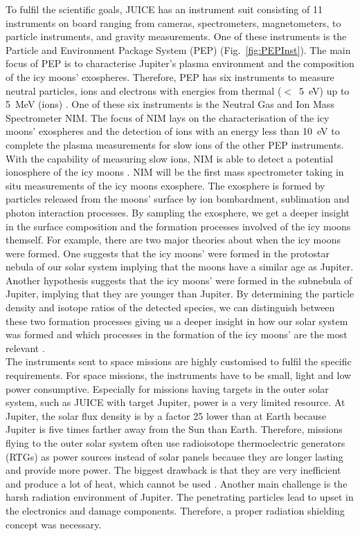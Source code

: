 	To fulfil the scientific goals, JUICE has an instrument suit consisting of 11 instruments on board ranging from cameras, spectrometers, magnetometers, to particle instruments, and gravity measurements. One of these instruments is the Particle and Environment Package System (PEP) (Fig.~\ref{fig:PEPInst}). The main focus of PEP is to characterise Jupiter's plasma environment and the composition of the icy moons' exospheres. Therefore, PEP has six instruments to measure neutral particles, ions and electrons with energies from thermal ($<$~5~eV) up to 5~MeV (ions) \cite{PEP_inst}. One of these six instruments is the Neutral Gas and Ion Mass Spectrometer NIM. The focus of NIM lays on the characterisation of the icy moons' exospheres and the detection of ions with an energy less than 10~eV to complete the plasma measurements for slow ions of the other PEP instruments. With the capability of measuring slow ions, NIM is able to detect a potential ionosphere of the icy moons \cite{Diss_Meyer}. NIM will be the first mass spectrometer taking in situ measurements of the icy moons exosphere. The exosphere is formed by particles released from the moons' surface by ion bombardment, sublimation and photon interaction processes. By sampling the exosphere, we get a deeper insight in the surface composition and the formation processes involved of the icy moons themself. For example, there are two major theories about when the icy moons were formed. One suggests that the icy moons' were formed in the protostar nebula of our solar system implying that the moons have a similar age as Jupiter. Another hypothesis suggests that the icy moons' were formed in the subnebula of Jupiter, implying that they are younger than Jupiter. By determining the particle density and isotope ratios of the detected species, we can distinguish between these two formation processes giving us a deeper insight in how our solar system was formed and which processes in the formation of the icy moons' are the most relevant \cite[and references therein]{Vorburger2015}.\\
	
	The instruments sent to space missions are highly customised to fulfil the specific requirements. For space missions, the instruments have to be small, light and low power consumptive. Especially for missions having targets in the outer solar system, such as JUICE with target Jupiter, power is a very limited resource. At Jupiter, the solar flux density is by a factor 25 lower than at Earth because Jupiter is five times farther away from the Sun than Earth. Therefore, missions flying to the outer solar system often use radioisotope thermoelectric generators (RTGs) as power sources instead of solar panels because they are longer lasting and provide more power. The biggest drawback is that they are very inefficient and produce a lot of heat, which cannot be used \cite{Power_Space}. Another main challenge is the harsh radiation environment of Jupiter. The penetrating particles lead to upset in the electronics and damage components. Therefore, a proper radiation shielding concept was necessary.\\

